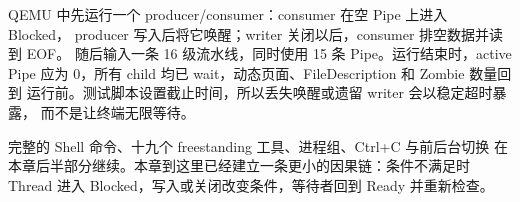 QEMU 中先运行一个 producer/consumer：consumer 在空 Pipe 上进入 Blocked，
producer 写入后将它唤醒；writer 关闭以后，consumer 排空数据并读到 EOF。
随后输入一条 16 级流水线，同时使用 15 条 Pipe。运行结束时，active Pipe
应为 0，所有 child 均已 wait，动态页面、FileDescription 和 Zombie 数量回到
运行前。测试脚本设置截止时间，所以丢失唤醒或遗留 writer 会以稳定超时暴露，
而不是让终端无限等待。

完整的 Shell 命令、十九个 freestanding 工具、进程组、Ctrl+C 与前后台切换
在本章后半部分继续。本章到这里已经建立一条更小的因果链：条件不满足时 Thread
进入 Blocked，写入或关闭改变条件，等待者回到 Ready 并重新检查。
